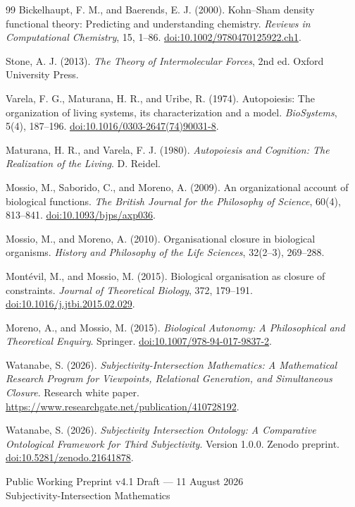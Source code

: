 \documentclass[11pt,a4paper]{article}
\begin{document}
\begin{thebibliography}{99}
Bickelhaupt, F. M., and Baerends, E. J. (2000). Kohn--Sham density functional theory: Predicting and understanding chemistry. \emph{Reviews in Computational Chemistry}, 15, 1--86. \href{https://doi.org/10.1002/9780470125922.ch1}{doi:10.1002/9780470125922.ch1}.

Stone, A. J. (2013). \emph{The Theory of Intermolecular Forces}, 2nd ed. Oxford University Press.

Varela, F. G., Maturana, H. R., and Uribe, R. (1974). Autopoiesis: The organization of living systems, its characterization and a model. \emph{BioSystems}, 5(4), 187--196. \href{https://doi.org/10.1016/0303-2647(74)90031-8}{doi:10.1016/0303-2647(74)90031-8}.

Maturana, H. R., and Varela, F. J. (1980). \emph{Autopoiesis and Cognition: The Realization of the Living}. D. Reidel.

Mossio, M., Saborido, C., and Moreno, A. (2009). An organizational account of biological functions. \emph{The British Journal for the Philosophy of Science}, 60(4), 813--841. \href{https://doi.org/10.1093/bjps/axp036}{doi:10.1093/bjps/axp036}.

Mossio, M., and Moreno, A. (2010). Organisational closure in biological organisms. \emph{History and Philosophy of the Life Sciences}, 32(2--3), 269--288.

Mont\'evil, M., and Mossio, M. (2015). Biological organisation as closure of constraints. \emph{Journal of Theoretical Biology}, 372, 179--191. \href{https://doi.org/10.1016/j.jtbi.2015.02.029}{doi:10.1016/j.jtbi.2015.02.029}.

Moreno, A., and Mossio, M. (2015). \emph{Biological Autonomy: A Philosophical and Theoretical Enquiry}. Springer. \href{https://doi.org/10.1007/978-94-017-9837-2}{doi:10.1007/978-94-017-9837-2}.

Watanabe, S. (2026). \emph{Subjectivity-Intersection Mathematics: A Mathematical Research Program for Viewpoints, Relational Generation, and Simultaneous Closure}. Research white paper. \url{https://www.researchgate.net/publication/410728192}.

Watanabe, S. (2026). \emph{Subjectivity Intersection Ontology: A Comparative Ontological Framework for Third Subjectivity}. Version 1.0.0. Zenodo preprint. \href{https://doi.org/10.5281/zenodo.21641878}{doi:10.5281/zenodo.21641878}.

\end{thebibliography}

\vfill
\begin{center}
\small\sffamily
Public Working Preprint v4.1 Draft --- 11 August 2026\\
Subjectivity-Intersection Mathematics
\end{center}
\end{document}
